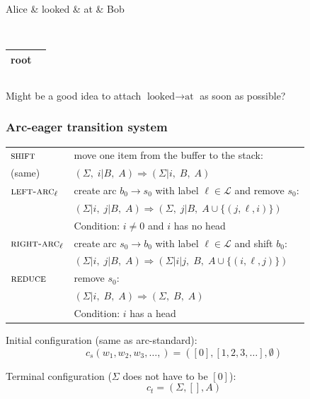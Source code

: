 \documentclass[t]{beamer}
\begin{document}
\begin{frame}
{\begin{varwidth}{2.2\linewidth}
{\begin{dependency}
\begin{deptext}[column sep=.7cm]
	Alice \& looked \& at \& Bob \\
	\end{deptext}
	\end{dependency}
	\\
	\begin{tabular}{|l|l|}\hline
	\color{red} root \\ \hline
	\end{tabular}
	\hspace{40mm}
	\begin{tabular}{|l|}\hline
	\quad \\ \hline
	\end{tabular}
	}
    \end{varwidth}
	}
	
	\pause\vfill
	Might be a good idea to attach $\textrm{looked} \to \textrm{at}$ as soon as possible?
\end{frame}


\begin{frame}
  \frametitle{Arc-eager transition system \cite{nivre2004incrementality}}
  \begin{tabular}{ll}
    $\textsc{shift}$ & move one item from the buffer to the stack: \\
    (same) & $(\Sigma, \; i | B, \; A) \Rightarrow (\Sigma | i, \; B, \; A)$ \\
    \hline
    $\textsc{left-arc}_\ell$ & create arc $b_0 \to s_0$ with label $\ell \in \mathcal{L}$ and remove $s_0$: \\
    & $(\Sigma | i, \; j | B, \; A) \Rightarrow (\Sigma, \; j | B, \; A \cup \{(j,\ell,i)\})$ \\
    & Condition: $i\neq0$ and $i$ has no head \\
    \hline
    $\textsc{right-arc}_\ell$ & create arc $s_0 \to b_0$ with label $\ell \in \mathcal{L}$ and shift $b_0$: \\
    & $(\Sigma | i, \; j | B, \; A) \Rightarrow (\Sigma | i|j, \; B, \; A \cup \{(i,\ell,j)\})$   \\
    \hline
    $\textsc{reduce}$ & remove $s_0$: \\
    & $(\Sigma | i, \; B, \; A) \Rightarrow (\Sigma, \; B, \; A)$ \\
    & Condition: $i$ has a head
  \end{tabular}
  
  \pause\vfill

  Initial configuration (same as arc-standard):
  \[
    c_s(w_1, w_2, w_3, \ldots,) = ([0], [1, 2, 3, \ldots], \emptyset)
  \]

  Terminal configuration ($\Sigma$ does not have to be $[0]$):
  \[
    c_t = (\Sigma, [], A)
  \]
\end{frame}
\end{document}
